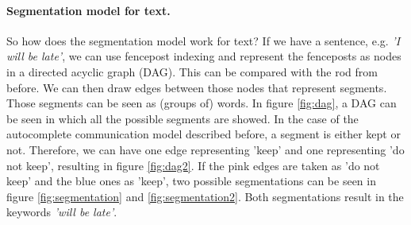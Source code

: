 \paragraph{Segmentation model for text.}
So how does the segmentation model work for text? 
If we have a sentence, e.g. \textit{'I will be late'}, we can use fencepost indexing and represent the fenceposts as nodes in a directed acyclic graph (DAG). 
This can be compared with the rod from before.
We can then draw edges between those nodes that represent segments. 
Those segments can be seen as (groups of) words. 
In figure \ref{fig:dag}, a DAG can be seen in which all the possible segments are showed. 
In the case of the autocomplete communication model described before, a segment is either kept or not.
Therefore, we can have one edge representing 'keep' and one representing 'do not keep', resulting in figure \ref{fig:dag2}.
If the pink edges are taken as 'do not keep' and the blue ones as 'keep', two possible segmentations can be seen in figure \ref{fig:segmentation} and \ref{fig:segmentation2}. 
Both segmentations result in the keywords \textit{'will be late'}. 

